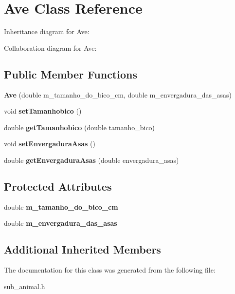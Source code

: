 \hypertarget{classAve}{}\section{Ave Class Reference}
\label{classAve}


Inheritance diagram for Ave\+:


Collaboration diagram for Ave\+:
\subsection*{Public Member Functions}
\begin{DoxyCompactItemize}
\item 
\mbox{\label{classAve_a977ebf0f49e02f4a10a951f526d71dab}} 
{\bfseries Ave} (double m\+\_\+tamanho\+\_\+do\+\_\+bico\+\_\+cm, double m\+\_\+envergadura\+\_\+das\+\_\+asas)
\item 
\mbox{\label{classAve_a46bffaf762c7ebc64ba615736737d928}} 
void {\bfseries set\+Tamanhobico} ()
\item 
\mbox{\label{classAve_ade894cd6ad4baf3c21ec948624094187}} 
double {\bfseries get\+Tamanhobico} (double tamanho\+\_\+bico)
\item 
\mbox{\label{classAve_aae05214703f1053bae5b3f7fca29c896}} 
void {\bfseries set\+Envergadura\+Asas} ()
\item 
\mbox{\label{classAve_a26aea311e8bbd362913c4e54790350cb}} 
double {\bfseries get\+Envergadura\+Asas} (double envergadura\+\_\+asas)
\end{DoxyCompactItemize}
\subsection*{Protected Attributes}
\begin{DoxyCompactItemize}
\item 
\mbox{\label{classAve_a6b226ae4077430877b040141105a9890}} 
double {\bfseries m\+\_\+tamanho\+\_\+do\+\_\+bico\+\_\+cm}
\item 
\mbox{\label{classAve_a6261373aae903e524e220e53ded18693}} 
double {\bfseries m\+\_\+envergadura\+\_\+das\+\_\+asas}
\end{DoxyCompactItemize}
\subsection*{Additional Inherited Members}


The documentation for this class was generated from the following file\+:\begin{DoxyCompactItemize}
\item 
sub\+\_\+animal.\+h\end{DoxyCompactItemize}

